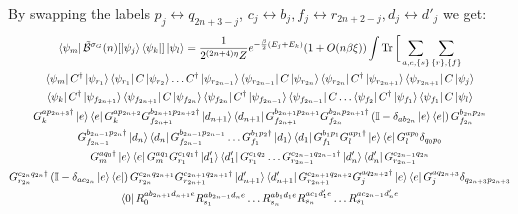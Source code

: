 \documentclass[aps,floatfix,10pt,amssymb,amsfont,amsmath,superscriptaddress,float,nofootinbib,longbibliography,nobalancelastpage,twocolumn]{revtex4-2}
\begin{document}
\begin{widetext}
By swapping the labels $p_j \leftrightarrow q_{2n+3-j}$, $c_j \leftrightarrow b_{j}, f_j \leftrightarrow r_{2n+2-j}, d_j \leftrightarrow d'_{j}$ we get:
\begin{multline}
    \bra{\psi_m}\tilde{\mathcal{B}}^{\sigma_G}(n)
    [\ket{\psi_j}\bra{\psi_k}]\ket{\psi_l}
    =
    \frac{1}{2^{(2n+4)\eta}Z}
    e^{-\frac{\beta}{2}(E_j+E_k)}
    (1+O(n\beta\xi))
    \int \operatorname{Tr}\bigg[
    \sum_{a,e,\{s\}}\sum_{\{r\},\{f\}}
    \\
    \bra{\psi_m}C^\dagger\ket{\psi_{r_1}}
    \bra{\psi_{r_1}}C\ket{\psi_{r_2}}
    \ldots
    C^\dagger\ket{\psi_{r_{2n-1}}}
    \bra{\psi_{r_{2n-1}}}C\ket{\psi_{r_{2n}}}
    \bra{\psi_{r_{2n}}}C^\dagger\ket{\psi_{r_{2n+1}}}
    \bra{\psi_{r_{2n+1}}}C\ket{\psi_j}
    \\
    \bra{\psi_k}C^\dagger\ket{\psi_{f_{2n+1}}}
    \bra{\psi_{f_{2n+1}}}C\ket{\psi_{f_{2n}}}
    \bra{\psi_{f_{2n}}}C^\dagger\ket{\psi_{f_{2n-1}}}
    \bra{\psi_{f_{2n-1}}}C
    \ldots
    \bra{\psi_{f_2}}C^\dagger\ket{\psi_{f_1}}
    \bra{\psi_{f_1}}C\ket{\psi_l}
    \\
    G^{a p_{2n+3}\dagger}_k\ket{e}\bra{e}
    G^{a p_{2n+2}}_k
    G^{b_{2n+1}p_{2n+2}\dagger}_{f_{2n+1}}
    \ket{d_{n+1}}\bra{d_{n+1}}
    G^{b_{2n+1}p_{2n+1}}_{f_{2n+1}}
    G^{b_{2n}p_{2n+1}\dagger}_{f_{2n}}
    \left(\mathbb{I}-\delta_{ab_{2n}}\ket{e}\bra{e}\right)
    G^{b_{2n}p_{2n}}_{f_{2n}}\\
    G^{b_{2n-1}p_{2n}\dagger}_{f_{2n-1}}
    \ket{d_n}\bra{d_n}
    G^{b_{2n-1}p_{2n-1}}_{f_{2n-1}}
    \ldots
    G^{b_1p_2\dagger}_{f_1}
    \ket{d_{1}}\bra{d_{1}}
    G^{b_1p_1}_{f_1}
    G^{a p_1\dagger}_l\ket{e}\bra{e}
    G^{a p_0}_l
    \delta_{q_0p_0}
    \\
    G^{a q_0\dagger}_m\ket{e}\bra{e}
    G^{a q_1}_m
    G^{c_1q_1\dagger}_{r_1}\ket{d'_1}\bra{d'_{1}}
    G^{c_1q_2}_{r_1}
    \ldots
    G^{c_{2n-1}q_{2n-1}\dagger}_{r_{2n-1}}
    \ket{d'_{n}}\bra{d'_{n}}
    G^{c_{2n-1}q_{2n}}_{r_{2n-1}}\\
    G^{c_{2n}q_{2n}\dagger}_{r_{2n}}
    \left(\mathbb{I}-\delta_{ac_{2n}}\ket{e}\bra{e}\right)
    G^{c_{2n}q_{2n+1}}_{r_{2n}}
    G^{c_{2n+1}q_{2n+1}\dagger}_{r_{2n+1}}
    \ket{d'_{n+1}}\bra{d'_{n+1}}
    G^{c_{2n+1}q_{2n+2}}_{r_{2n+1}}
    G^{a q_{2n+2}\dagger}_j\ket{e}\bra{e}
    G^{a q_{2n+3}}_j
    \delta_{q_{2n+3}p_{2n+3}}
    \\
    \bra{0}
    R_0^{ab_{2n+1}d_{n+1}e}
    R_{s_1}^{ab_{2n-1}d_{n}e}
    \ldots
    R_{s_n}^{ab_1d_{1}e}R_{s_n}^{ac_1d'_{1}e}
    \ldots
    R_{s_1}^{ac_{2n-1}d'_ne}

\end{multline}
\end{widetext}
\end{document}

